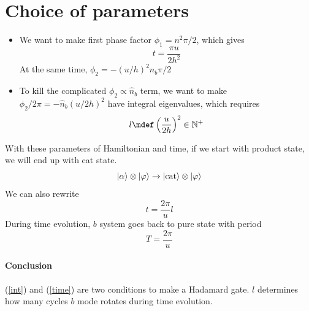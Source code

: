 \documentclass[11pt]{article}
\begin{document}
\section{Choice of parameters}
\begin{itemize}
\item We want to make first phase factor $\phi_1=n^2\pi/2$, which gives
\begin{equation}
t=\frac{\pi u}{2h^2}
\end{equation}
At the same time, $\phi_2=- (u/h)^2n_b\pi/2$

\item To kill the complicated $\phi_2\propto\hat n_b$ term, we want to make $\phi_2/2\pi=-\hat n_b(u/2h)^2$ have integral eigenvalues, which requires
\begin{equation}
	l\mdef\left(\frac{u}{2h}\right)^2\in \mathbb{N^+}\label{int}
\end{equation}
\end{itemize}
With these parameters of Hamiltonian and time, if we start with product state, we will end up with cat state. 
\begin{equation}
\ket{\alpha}\otimes\ket{\varphi}\rightarrow \ket{\mathrm{cat}}\otimes \ket{\varphi}
\end{equation}
We can also rewrite
\begin{equation}
t=\frac{2\pi}{u}l\label{time}
\end{equation}
During time evolution, $b$ system goes back to pure state with period
\begin{equation}T = \frac{2\pi}{u}\end{equation}
\paragraph{Conclusion} (\ref{int}) and (\ref{time}) are two conditions to make a Hadamard gate. $l$ determines how many cycles $b$ mode rotates during time evolution. 
\end{document}
